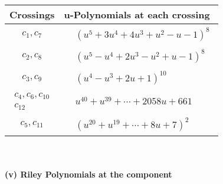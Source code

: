 \documentclass[1p]{elsarticle_modified}
\theoremstyle{definition}
\begin{document}
\begin{tabular}{m{50pt}|m{274pt}}
Crossings & \hspace{64pt}u-Polynomials at each crossing \\
\hline $$\begin{aligned}c_{1},c_{7}\end{aligned}$$&$\begin{aligned}
&(u^5+3 u^4+4 u^3+u^2- u-1)^8
\end{aligned}$\\
\hline $$\begin{aligned}c_{2},c_{8}\end{aligned}$$&$\begin{aligned}
&(u^5- u^4+2 u^3- u^2+u-1)^8
\end{aligned}$\\
\hline $$\begin{aligned}c_{3},c_{9}\end{aligned}$$&$\begin{aligned}
&(u^4- u^3+2 u+1)^{10}
\end{aligned}$\\
\hline $$\begin{aligned}c_{4},c_{6},c_{10}\\c_{12}\end{aligned}$$&$\begin{aligned}
&u^{40}+u^{39}+\cdots+2058 u+661
\end{aligned}$\\
\hline $$\begin{aligned}c_{5},c_{11}\end{aligned}$$&$\begin{aligned}
&(u^{20}+u^{19}+\cdots+8 u+7)^{2}
\end{aligned}$\\
\hline
\end{tabular}\\~\\
\newpage\renewcommand{\arraystretch}{1}
\flushleft \textbf{(v) Riley Polynomials at the component}\newline \\
\end{document}
